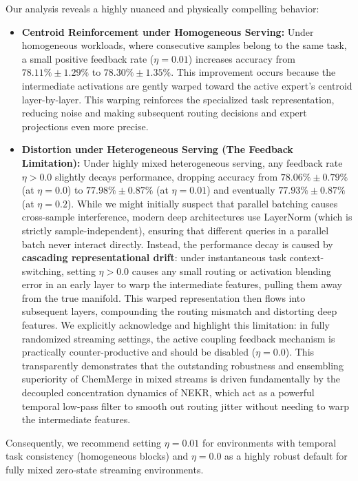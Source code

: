 Our analysis reveals a highly nuanced and physically compelling behavior:
\begin{itemize}
    \item \textbf{Centroid Reinforcement under Homogeneous Serving:} Under homogeneous workloads, where consecutive samples belong to the same task, a small positive feedback rate (\textbf{$\eta = 0.01$}) increases accuracy from $78.11\% \pm 1.29\%$ to \textbf{$78.30\% \pm 1.35\%$}. This improvement occurs because the intermediate activations are gently warped toward the active expert's centroid layer-by-layer. This warping reinforces the specialized task representation, reducing noise and making subsequent routing decisions and expert projections even more precise.
    \item \textbf{Distortion under Heterogeneous Serving (The Feedback Limitation):} Under highly mixed heterogeneous serving, any feedback rate $\eta > 0.0$ slightly decays performance, dropping accuracy from $78.06\% \pm 0.79\%$ (at $\eta=0.0$) to $77.98\% \pm 0.87\%$ (at $\eta=0.01$) and eventually $77.93\% \pm 0.87\%$ (at $\eta=0.2$). While we might initially suspect that parallel batching causes cross-sample interference, modern deep architectures use LayerNorm (which is strictly sample-independent), ensuring that different queries in a parallel batch never interact directly. Instead, the performance decay is caused by \textbf{cascading representational drift}: under instantaneous task context-switching, setting $\eta > 0.0$ causes any small routing or activation blending error in an early layer to warp the intermediate features, pulling them away from the true manifold. This warped representation then flows into subsequent layers, compounding the routing mismatch and distorting deep features. We explicitly acknowledge and highlight this limitation: in fully randomized streaming settings, the active coupling feedback mechanism is practically counter-productive and should be disabled ($\eta = 0.0$). This transparently demonstrates that the outstanding robustness and ensembling superiority of ChemMerge in mixed streams is driven fundamentally by the decoupled concentration dynamics of NEKR, which act as a powerful temporal low-pass filter to smooth out routing jitter without needing to warp the intermediate features.
\end{itemize}
Consequently, we recommend setting $\eta = 0.01$ for environments with temporal task consistency (homogeneous blocks) and $\eta = 0.0$ as a highly robust default for fully mixed zero-state streaming environments.

